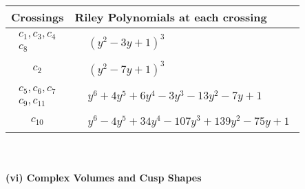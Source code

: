 \documentclass[1p]{elsarticle_modified}
\theoremstyle{definition}
\begin{document}
\begin{tabular}{m{50pt}|m{274pt}}
Crossings & \hspace{64pt}Riley Polynomials at each crossing \\
\hline $$\begin{aligned}c_{1},c_{3},c_{4}\\c_{8}\end{aligned}$$&$\begin{aligned}
&(y^2-3 y+1)^3
\end{aligned}$\\
\hline $$\begin{aligned}c_{2}\end{aligned}$$&$\begin{aligned}
&(y^2-7 y+1)^3
\end{aligned}$\\
\hline $$\begin{aligned}c_{5},c_{6},c_{7}\\c_{9},c_{11}\end{aligned}$$&$\begin{aligned}
&y^6+4 y^5+6 y^4-3 y^3-13 y^2-7 y+1
\end{aligned}$\\
\hline $$\begin{aligned}c_{10}\end{aligned}$$&$\begin{aligned}
&y^6-4 y^5+34 y^4-107 y^3+139 y^2-75 y+1
\end{aligned}$\\
\hline
\end{tabular}\\~\\
\newpage\flushleft \textbf{(vi) Complex Volumes and Cusp Shapes}
\end{document}

